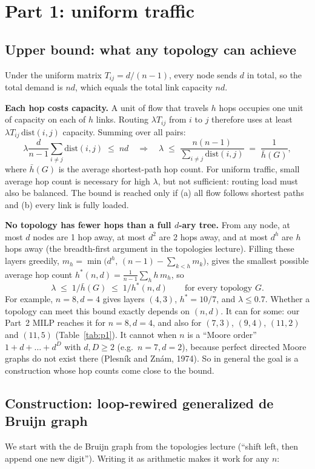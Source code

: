 \documentclass[11pt,letterpaper]{article}
\begin{document}
\section{Part 1: uniform traffic}

\subsection{Upper bound: what any topology can achieve}
Under the uniform matrix $T_{ij}=d/(n-1)$, every node sends $d$ in total, so the
total demand is $nd$, which equals the total link capacity $nd$.

\textbf{Each hop costs capacity.} A unit of flow that travels $h$ hops occupies
one unit of capacity on each of $h$ links. Routing $\lambda T_{ij}$ from $i$ to
$j$ therefore uses at least $\lambda T_{ij}\,\mathrm{dist}(i,j)$ capacity. Summing
over all pairs:
\[
\lambda \frac{d}{n-1}\sum_{i\neq j}\mathrm{dist}(i,j) \;\le\; nd
\quad\Longrightarrow\quad
\lambda \;\le\; \frac{n(n-1)}{\sum_{i\neq j}\mathrm{dist}(i,j)} \;=\; \frac{1}{\bar h(G)},
\]
where $\bar h(G)$ is the average shortest-path hop count. For uniform traffic,
small average hop count is necessary for high $\lambda$, but not sufficient:
routing load must also be balanced. The bound is reached only if (a) all flow
follows shortest paths and (b) every link is fully loaded.

\textbf{No topology has fewer hops than a full $d$-ary tree.} From any node, at
most $d$ nodes are 1 hop away, at most $d^2$ are 2 hops away, and at most $d^h$
are $h$ hops away (the breadth-first argument in the topologies lecture). Filling
these layers greedily, $m_h=\min\!\big(d^h,\,(n-1)-\sum_{k<h}m_k\big)$, gives the
smallest possible average hop count $h^*(n,d)=\frac{1}{n-1}\sum_h h\,m_h$, so
\[
\lambda \;\le\; 1/\bar h(G) \;\le\; 1/h^*(n,d) \qquad\text{for every topology } G.
\]
For example, $n=8,d=4$ gives layers $(4,3)$, $h^*=10/7$, and $\lambda\le 0.7$.
Whether a topology can meet this bound exactly depends on $(n,d)$. It can for
some: our Part~2 MILP reaches it for $n=8,d=4$, and also for $(7,3)$, $(9,4)$,
$(11,2)$ and $(11,5)$ (Table~\ref{tab:p1}). It cannot when $n$ is a ``Moore order''
$1+d+\dots+d^D$ with $d,D\ge2$ (e.g.\ $n=7,d=2$), because perfect directed Moore
graphs do not exist there (Plesn\'ik and Zn\'am, 1974). So in general the goal is a
construction whose hop counts come close to the bound.

\subsection{Construction: loop-rewired generalized de Bruijn graph}
We start with the de Bruijn graph from the topologies lecture (``shift left, then
append one new digit''). Writing it as arithmetic makes it work for any $n$:
\end{document}

